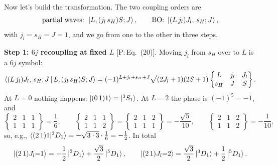 \documentclass[11pt,a4paper]{article}
\newcommand{\tagP}[1]{\textcolor{blue!65!black}{\textsf{\small[P:\,#1]}}}
\newenvironment{aiadd}{\par}{\par}
\begin{document}
\begin{aiadd}
	Now let's build the transformation. The two coupling orders are
	\[
		\text{partial waves: }\ket{L,(j_l\,s_H)S;J},\qquad
		\text{BO: }\ket{(L\,j_l)J_l,\,s_H;J},
	\]
	with $j_l=s_H=J=1$, and we go from one to the other in three steps.

	\textbf{Step 1: $6j$ recoupling at fixed $L$} \tagP{Eq.~(20)}. Moving $j_l$ from $s_H$ over to $L$ is a $6j$ symbol:
	\[
		\braket{(L\,j_l)J_l,\,s_H;J\,|\,L,(j_l\,s_H)S;J}=(-1)^{L+j_l+s_H+J}\sqrt{(2J_l+1)(2S+1)}\begin{Bmatrix}L&j_l&J_l\\ s_H&J&S\end{Bmatrix}.
	\]
	At $L=0$ nothing happens: $\ket{(0\,1)1}=\ket{^3S_1}$. At $L=2$ the phase is $(-1)^5=-1$, and
	\[
		\begin{Bmatrix}2&1&1\\1&1&1\end{Bmatrix}=\frac16,\qquad
		\begin{Bmatrix}2&1&1\\1&1&2\end{Bmatrix}=\begin{Bmatrix}2&1&2\\1&1&1\end{Bmatrix}=-\frac{\sqrt5}{10},\qquad
		\begin{Bmatrix}2&1&2\\1&1&2\end{Bmatrix}=-\frac{1}{10},
	\]
	so, e.g., $\braket{(2\,1)1|{}^3D_1}=-\sqrt{3\cdot3}\cdot\frac16=-\frac12$. In total
	\[
		\ket{(2\,1)J_l{=}1}=-\frac12\ket{^3D_1}+\frac{\sqrt3}{2}\ket{^5D_1},\qquad
		\ket{(2\,1)J_l{=}2}=\frac{\sqrt3}{2}\ket{^3D_1}+\frac12\ket{^5D_1}.
	\]


\end{aiadd}
\end{document}
